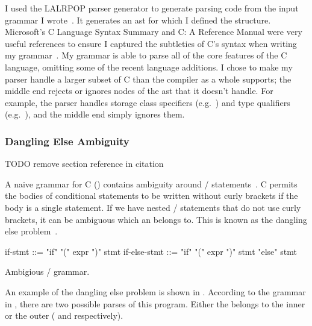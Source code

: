\documentclass[00-main.tex]{subfiles}
\begin{document}
I used the LALRPOP parser generator to generate parsing code from the input grammar I wrote~.
It generates an \gls{ast} for which I defined the structure.
Microsoft's C Language Syntax Summary and C: A Reference Manual were very useful references to ensure I captured the subtleties of C's syntax when writing my grammar~. %
My grammar is able to parse all of the core features of the C language, omitting some of the recent language additions. I chose to make my parser handle a larger subset of C than the compiler as a whole supports; the middle end rejects or ignores nodes of the \gls{ast} that it doesn't handle. For example, the parser handles storage class specifiers (e.g.~) and type qualifiers (e.g.~), and the middle end simply ignores them.

\subsubsection{Dangling Else Ambiguity}

\begin{mrwComment}
TODO remove section reference in citation
\end{mrwComment}

A naive grammar for C () contains ambiguity around / statements~.
C permits the bodies of conditional statements to be written without curly brackets if the body is a single statement.
If we have nested / statements that do not use curly brackets, it can be ambiguous which  an  belongs to. This is known as the dangling else problem~.

\begin{listing}[t]
  \begin{GrammarListing}
    if-stmt      ::= "if" "(" expr ")" stmt
    if-else-stmt ::= "if" "(" expr ")" stmt "else" stmt
  \end{GrammarListing}
  \caption{Ambigious / grammar.}
  \label{lst:ambiguous if-else grammar}
\end{listing}

An example of the dangling else problem is shown in .
According to the grammar in , there are two possible parses of this program.
Either the  belongs to the inner or the outer  ( and  respectively).
\end{document}
